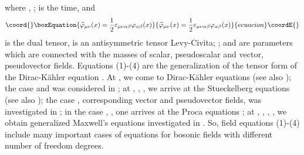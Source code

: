 \documentclass[a4paper,12pt]{article}
\begin{document}
where \coordHE{}, \coordHE{}; \coordHE{} is the time, and
\begin{equation}\coord{}\boxEquation{
\widetilde{\varphi }_{\mu \nu }(x)=\frac 12\varepsilon _{\mu \nu
\alpha \beta }\varphi _{\alpha \beta }(x) \label{4}
}{
\widetilde{\varphi }_{\mu \nu }(x)=\frac 12\varepsilon _{\mu \nu
\alpha \beta }\varphi _{\alpha \beta }(x) }{ecuacion}\coordE{}\end{equation}
is the dual tensor, \myHighlight{$\varepsilon _{\mu \nu \alpha \beta }$}\coordHE{} is an
antisymmetric tensor Levy-Civita; \coordHE{}; \coordHE{}
and \coordHE{} are parameters which are connected with the masses of
scalar, pseudoscalar and vector, pseudovector fields. Equations
(1)-(4) are the generalization of the tensor form of the
Dirac-K\"ahler equation \cite{Kahler}. At \coordHE{}, we come to
Dirac-K\"ahler equations \cite{Kruglov1} (see also \cite{monogr});
the case \coordHE{} and  \coordHE{} was considered in \cite{Kruglov2}; at \coordHE{},
\coordHE{}, \coordHE{}, we
arrive at the Stueckelberg equations \cite{Stueckelberg} (see also
\cite{Kruglov3}); the case \coordHE{}, corresponding vector and
pseudovector fields, was investigated in \cite{Kruglov4}; in the
case \coordHE{}, \coordHE{}, \coordHE{} one arrives at the Proca equations
\cite{Proca}; at \coordHE{}, \coordHE{}, \coordHE{}, \coordHE{}, we obtain generalized Maxwell's
equations investigated in \cite{Kruglov5}. So, field equations
(1)-(4) include many important cases of equations for bosonic
fields with different number of freedom degrees.
\end{document}

